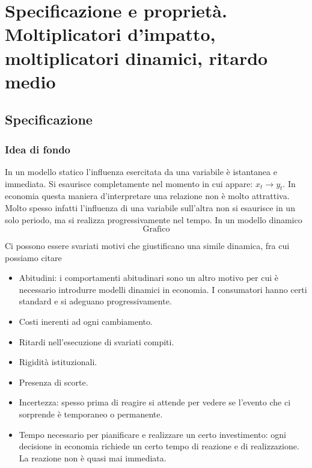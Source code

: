 \documentclass[a4paper]{report}
\newcounter{ese}
\theoremstyle{remark}
\begin{document}
\section{Specificazione e propriet\`{a}. Moltiplicatori d'impatto,
moltiplicatori dinamici, ritardo medio}

\subsection{Specificazione}

\subsubsection{Idea di fondo}

In un modello statico l'influenza esercitata da una variabile \`{e}
istantanea e immediata. Si esaurisce completamente nel momento in cui
appare: $x_{t}\longrightarrow y_{t}$. In economia questa maniera
d'interpretare una relazione non \`{e} molto attrattiva. Molto spesso
infatti l'influenza di una variabile sull'altra non si esaurisce in un solo
periodo, ma si realizza progressivamente nel tempo. In un modello dinamico%
\begin{equation*}
\text{Grafico}
\end{equation*}

\vspace{5cm}\noindent Ci possono essere svariati motivi che giustificano una
simile dinamica, fra cui possiamo citare

\begin{itemize}
\item Abitudini: i comportamenti abitudinari sono un altro motivo per cui 
\`{e} necessario introdurre modelli dinamici in economia. I consumatori
hanno certi standard e si adeguano progressivamente.

\item Costi inerenti ad ogni cambiamento.

\item Ritardi nell'esecuzione di svariati compiti.

\item Rigidit\`{a} istituzionali.

\item Presenza di scorte.

\item Incertezza: spesso prima di reagire si attende per vedere se l'evento
che ci sorprende \`{e} temporaneo o permanente.

\item Tempo necessario per pianificare e realizzare un certo investimento:
ogni decisione in economia richiede un certo tempo di reazione e di
realizzazione. La reazione non \`{e} quasi mai immediata.
\end{itemize}
\end{document}
